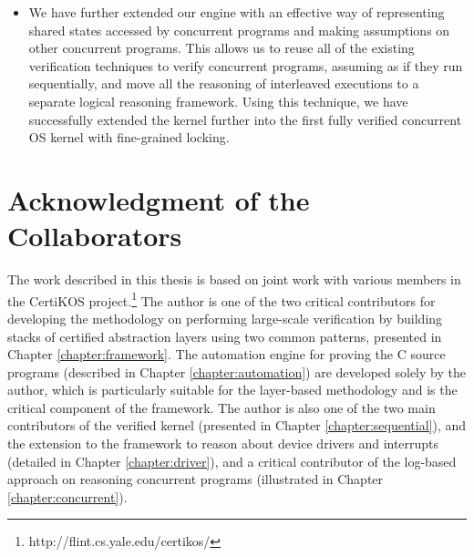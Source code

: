 \begin{itemize}
\item We have further extended our engine with an effective way of representing
shared states accessed by concurrent programs and making assumptions
on other concurrent programs. This allows us to reuse all of the
existing verification techniques to verify concurrent programs, assuming as if
they run sequentially, and move all the reasoning of interleaved executions
to a separate logical reasoning framework.  
Using this technique, we have successfully extended the kernel further
into the first fully verified concurrent OS kernel with fine-grained locking.
  
\end{itemize}

\section{Acknowledgment of the Collaborators}

The work described in this thesis is based on joint work with various members
in the CertiKOS project.\footnote{http://flint.cs.yale.edu/certikos/}
The author is one of the two critical contributors for developing the methodology
on performing large-scale verification by building stacks of certified abstraction layers
using two common patterns, presented in Chapter \ref{chapter:framework}. The automation
engine for proving the C source programs (described in Chapter \ref{chapter:automation})
are developed solely by the author, which is particularly suitable for the
layer-based methodology and is the critical component of the framework. 
The author is also one of the two main contributors of the verified kernel (presented
in Chapter \ref{chapter:sequential}), and the
extension to the framework to reason about device drivers and interrupts
(detailed in Chapter \ref{chapter:driver}), and a critical contributor
of the log-based approach on reasoning
concurrent programs (illustrated in Chapter \ref{chapter:concurrent}). 


